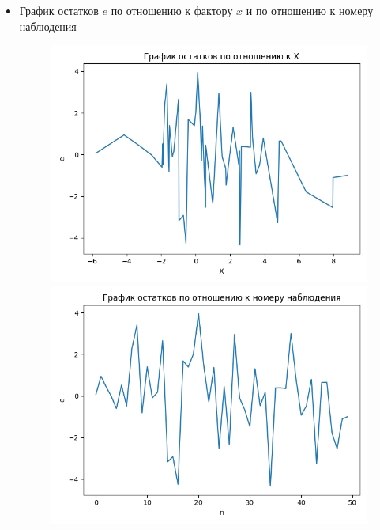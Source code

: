 \begin{itemize}
	\item График остатков $e$ по отношению к фактору $x$ и по отношению к номеру наблюдения
	
	\begin{figure}[H]
		\begin{minipage}[H]{0.5\linewidth}
			\begin{center}
				\includegraphics[width=\linewidth]{figures/X_e}
			\end{center}
		\end{minipage}
		\hfill
		\begin{minipage}[H]{0.5\linewidth}
			\begin{center}
				\includegraphics[width=\linewidth]{figures/n_e}
			\end{center}
		\end{minipage}
	\end{figure}


\end{itemize}
